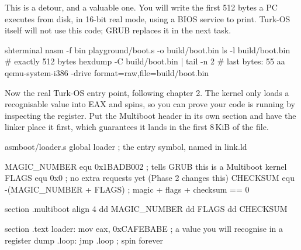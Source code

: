 \documentclass[11pt,a4paper]{article}
\begin{document}
This is a detour, and a valuable one. You will write the first 512 bytes a PC executes from disk, in 16-bit real
mode, using a BIOS service to print. Turk-OS itself will not use this code; GRUB replaces it in the next task.


\begin{lst}{sh}{terminal}
nasm -f bin playground/boot.s -o build/boot.bin
ls -l build/boot.bin             # exactly 512 bytes
hexdump -C build/boot.bin | tail -n 2   # last bytes: 55 aa
qemu-system-i386 -drive format=raw,file=build/boot.bin
\end{lst}

Now the real Turk-OS entry point, following \LOB chapter 2. The kernel only loads a recognisable value into EAX and
spins, so you can prove your code is running by inspecting the register. Put the Multiboot header in its own section
and have the linker place it first, which guarantees it lands in the first 8\,KiB of the file.

\begin{lst}{asm}{boot/loader.s}
global loader                   ; the entry symbol, named in link.ld

MAGIC_NUMBER equ 0x1BADB002     ; tells GRUB this is a Multiboot kernel
FLAGS        equ 0x0            ; no extra requests yet (Phase 2 changes this)
CHECKSUM     equ -(MAGIC_NUMBER + FLAGS)   ; magic + flags + checksum == 0

section .multiboot
align 4
    dd MAGIC_NUMBER
    dd FLAGS
    dd CHECKSUM

section .text
loader:
    mov eax, 0xCAFEBABE         ; a value you will recognise in a register dump
.loop:
    jmp .loop                   ; spin forever
\end{lst}
\end{document}
